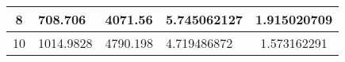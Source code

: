 \begin{table}
\begin{tabular}{|c|l|l|l|c|}
8                                                                                                          & 708.706                                                                                                                                                                   & 4071.56                                                                                                                                    & 5.745062127                            & 1.915020709         \\ \hline
10                                                                                                         & 1014.9828                                                                                                                                                                 & 4790.198                                                                                                                                   & 4.719486872                            & 1.573162291         \\ \hline
\end{tabular}
\end{table}

